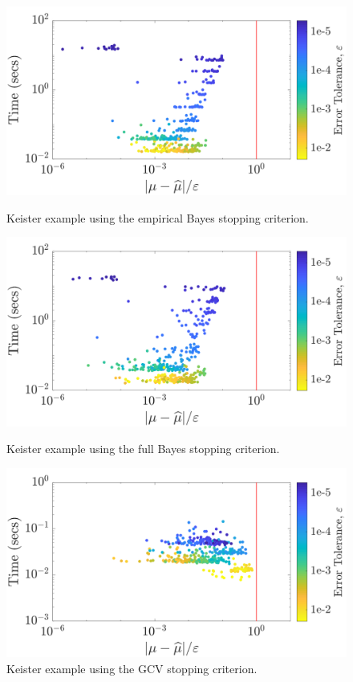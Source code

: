 \documentclass[twocolumn]{svjour3}          %
\begin{document}
\begin{figure}
	\centering
	\includegraphics[width=0.95\linewidth]{"Lattice_Keister_guaranteed_time_MLE_C1sin_d4_r2_2019-Jun-27"}
	\caption[Keister guaranteed:MLE]{Keister example using the empirical Bayes stopping criterion.}
	\label{fig:keister-guaranteed-MLE}
	\centering
	\includegraphics[width=0.95\linewidth]{"Lattice_Keister_guaranteed_time_full_C1sin_d4_r2_2019-Jun-27"}
	\caption[Keister guaranteed:FB]{Keister example using the full Bayes stopping criterion.}
	\label{fig:keister-guaranteed-FB}
	\centering
	\includegraphics[width=0.95\linewidth]{"Lattice_Keister_guaranteed_time_GCV_C1sin_d4_r2_2019-Jun-27"}
	\caption[Keister guaranteed:GCV]{Keister example using the GCV stopping criterion.}
	\label{fig:keister-guaranteed-GCV}
\end{figure}
\end{document}
